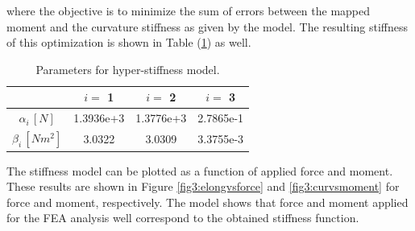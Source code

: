 where the objective is to minimize the sum of errors between the mapped moment and the curvature stiffness as given by the model. The resulting stiffness of this optimization is shown in Table (\ref{tab3:stiffnessparameters}) as well. 

\begin{table}[H]
    \centering
        \caption{Parameters for hyper-stiffness model.}
\begin{tabular}{|c|c|c|c|} \hline
            &  $i = $ 1      &    $i = $    2   &  $i = $ 3  \\ \hline
   $\alpha_i \hspace{2pt}[N]$    &    1.3936e+3    & 1.3776e+3    & 2.7865e-1 \\ \hline
   $\beta_i \hspace{2pt}  [Nm^2] $     &  3.0322 & 3.0309    &  3.3755e-3\\ \hline
\end{tabular}
    \label{tab3:stiffnessparameters}
\end{table}

The stiffness model can be plotted as a function of applied force and moment. These results are shown in Figure \ref{fig3:elongvsforce} and \ref{fig3:curvsmoment} for force and moment, respectively. The model shows that force and moment applied for the FEA analysis well correspond to the obtained stiffness function. 


